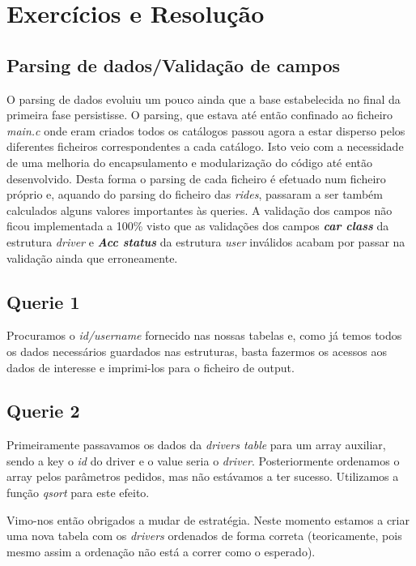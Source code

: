 \documentclass[12pt,a4paper]{article}
\begin{document}
\clearpage
\section{Exercícios e Resolução}
\subsection{Parsing de dados/Validação de campos}
    O parsing de dados evoluiu um pouco ainda que a base estabelecida no final da primeira fase persistisse. O parsing, que estava até então confinado ao ficheiro \textit{main.c} onde eram criados todos os catálogos passou agora a estar disperso pelos diferentes ficheiros correspondentes a cada catálogo. Isto veio com a necessidade de uma melhoria do encapsulamento e modularização do código até então desenvolvido. Desta forma o parsing de cada ficheiro é efetuado num ficheiro próprio e, aquando do parsing do ficheiro das \textit{rides}, passaram a ser também calculados alguns valores importantes às queries.
    A validação dos campos não ficou implementada a 100\% visto que as validações dos campos \textit{\textbf{car class}} da estrutura \textit{driver} e \textit{\textbf{Acc status}} da estrutura \textit{user}
    inválidos acabam por passar na validação ainda que erroneamente.
    
\subsection{Querie 1}
    \par Procuramos o \textit{id/username} fornecido nas nossas tabelas e, como já temos todos os dados necessários guardados nas estruturas, basta fazermos os acessos aos dados de interesse e imprimi-los para o ficheiro de output.

\subsection{Querie 2}
    \par Primeiramente passavamos os dados da \textit{drivers table} para um array auxiliar, sendo a key o \textit{id} do driver e o value seria o \textit{driver}. Posteriormente ordenamos o array pelos parâmetros pedidos, mas não estávamos a ter sucesso. Utilizamos a função \textit{qsort} para este efeito.
    \par Vimo-nos então obrigados a mudar de estratégia. Neste momento estamos a criar uma nova tabela com os \textit{drivers} ordenados de forma correta (teoricamente, pois mesmo assim a ordenação não está a correr como o esperado).
\end{document}
